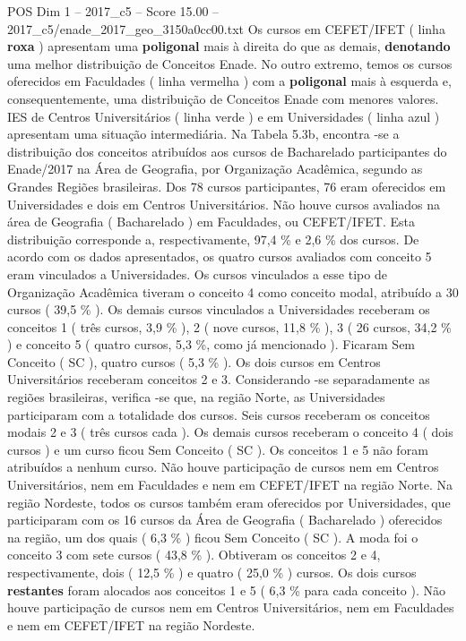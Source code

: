 \begin{textsample}{POS Dim 1 – 2017\_c5 – Score 15.00 – 2017\_c5/enade\_2017\_geo\_3150a0cc00.txt}
Os cursos em CEFET/IFET ( linha \textbf{roxa} ) apresentam uma \textbf{poligonal} mais à direita do que as demais, \textbf{denotando} uma melhor distribuição de Conceitos Enade.
No outro extremo, temos os cursos oferecidos em Faculdades ( linha vermelha ) com a \textbf{poligonal} mais à esquerda e, consequentemente, uma distribuição de Conceitos Enade com menores valores.
IES de Centros Universitários ( linha verde ) e em Universidades ( linha azul ) apresentam uma situação intermediária.
Na Tabela 5.3b, encontra -se a distribuição dos conceitos atribuídos aos cursos de Bacharelado participantes do Enade/2017 na Área de Geografia, por Organização Acadêmica, segundo as Grandes Regiões brasileiras.
Dos 78 cursos participantes, 76 eram oferecidos em Universidades e dois em Centros Universitários.
Não houve cursos avaliados na área de Geografia ( Bacharelado ) em Faculdades, ou CEFET/IFET.
Esta distribuição corresponde a, respectivamente, 97,4 \% e 2,6 \% dos cursos.
De acordo com os dados apresentados, os quatro cursos avaliados com conceito 5 eram vinculados a Universidades.
Os cursos vinculados a esse tipo de Organização Acadêmica tiveram o conceito 4 como conceito modal, atribuído a 30 cursos ( 39,5 \% ).
Os demais cursos vinculados a Universidades receberam os conceitos 1 ( três cursos, 3,9 \% ), 2 ( nove cursos, 11,8 \% ), 3 ( 26 cursos, 34,2 \% ) e conceito 5 ( quatro cursos, 5,3 \%, como já mencionado ).
Ficaram Sem Conceito ( SC ), quatro cursos ( 5,3 \% ).
Os dois cursos em Centros Universitários receberam conceitos 2 e 3.
Considerando -se separadamente as regiões brasileiras, verifica -se que, na região Norte, as Universidades participaram com a totalidade dos cursos.
Seis cursos receberam os conceitos modais 2 e 3 ( três cursos cada ).
Os demais cursos receberam o conceito 4 ( dois cursos ) e um curso ficou Sem Conceito ( SC ).
Os conceitos 1 e 5 não foram atribuídos a nenhum curso.
Não houve participação de cursos nem em Centros Universitários, nem em Faculdades e nem em CEFET/IFET na região Norte.
Na região Nordeste, todos os cursos também eram oferecidos por Universidades, que participaram com os 16 cursos da Área de Geografia ( Bacharelado ) oferecidos na região, um dos quais ( 6,3 \% ) ficou Sem Conceito ( SC ).
A moda foi o conceito 3 com sete cursos ( 43,8 \% ).
Obtiveram os conceitos 2 e 4, respectivamente, dois ( 12,5 \% ) e quatro ( 25,0 \% ) cursos.
Os dois cursos \textbf{restantes} foram alocados aos conceitos 1 e 5 ( 6,3 \% para cada conceito ).
Não houve participação de cursos nem em Centros Universitários, nem em Faculdades e nem em CEFET/IFET na região Nordeste.

\end{textsample}
